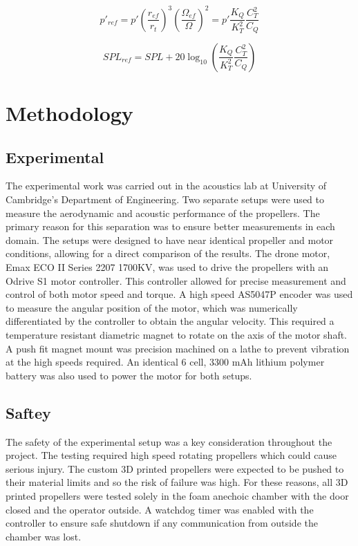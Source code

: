 \documentclass[12pt,a4paper]{article}
\begin{document}
\begin{equation}
    p'_{ref} = p' \left(\frac{r_{ef}}{r_t}\right)^3 \left( \frac{\Omega_{ef}}{\Omega}\right)^2 = p' \frac{K_Q}{K_T^2} \frac{C_T^2}{C_Q} 
\end{equation}

\begin{equation}
    SPL_{ref} = SPL + 20 \log_{10} \left( \frac{K_Q}{K_T^2} \frac{C_T^2}{C_Q}  \right)
\end{equation}

\section{Methodology}


\subsection{Experimental}
The experimental work was carried out in the acoustics lab at University of Cambridge's Department of Engineering.
Two separate setups were used to measure the aerodynamic and acoustic performance of the propellers.
The primary reason for this separation was to ensure better measurements in each domain.
The setups were designed to have near identical propeller and motor conditions, allowing for a direct comparison of the results.
The drone motor, Emax ECO II Series 2207 1700KV, was used to drive the propellers with an Odrive S1 motor controller.
This controller allowed for precise measurement and control of both motor speed and torque.
A high speed AS5047P encoder was used to measure the angular position of the motor, which was numerically differentiated by the controller to obtain the angular velocity.
This required a temperature resistant diametric magnet to rotate on the axis of the motor shaft.
A push fit magnet mount was precision machined on a lathe to prevent vibration at the high speeds required.
An identical 6 cell, 3300 mAh lithium polymer battery was also used to power the motor for both setups.

\subsection{Saftey}
The safety of the experimental setup was a key consideration throughout the project.
The testing required high speed rotating propellers which could cause serious injury.
The custom 3D printed propellers were expected to be pushed to their material limits and so the risk of failure was high.
For these reasons, all 3D printed propellers were tested solely in the foam anechoic chamber with the door closed and the operator outside.
A watchdog timer was enabled with the controller to ensure safe shutdown if any communication from outside the chamber was lost.
\end{document}
